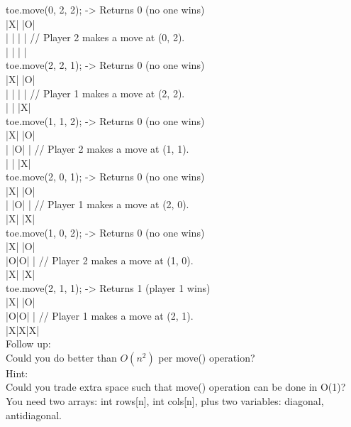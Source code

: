 toe.move(0, 2, 2); -> Returns 0 (no one wins)\\
|X| |O|\\
| | | | // Player 2 makes a move at (0, 2).\\
| | | |\\

toe.move(2, 2, 1); -> Returns 0 (no one wins)\\
|X| |O|\\
| | | | // Player 1 makes a move at (2, 2).\\
| | |X|\\

toe.move(1, 1, 2); -> Returns 0 (no one wins)\\
|X| |O|\\
| |O| | // Player 2 makes a move at (1, 1).\\
| | |X|\\

toe.move(2, 0, 1); -> Returns 0 (no one wins)\\
|X| |O|\\
| |O| | // Player 1 makes a move at (2, 0).\\
|X| |X|\\

toe.move(1, 0, 2); -> Returns 0 (no one wins)\\
|X| |O|\\
|O|O| | // Player 2 makes a move at (1, 0).\\
|X| |X|\\

toe.move(2, 1, 1); -> Returns 1 (player 1 wins)\\
|X| |O|\\
|O|O| | // Player 1 makes a move at (2, 1).\\
|X|X|X|\\

Follow up:\\
Could you do better than $O(n^2)$ per move() operation?\\

Hint:\\
Could you trade extra space such that move() operation can be done in O(1)? You need two arrays: int rows[n], int cols[n], plus two variables: diagonal, antidiagonal. \\

